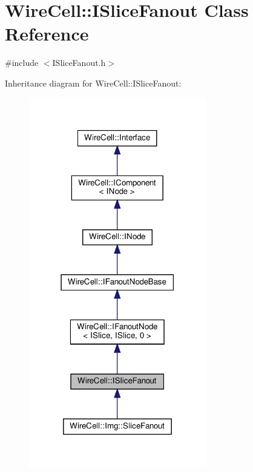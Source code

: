 \hypertarget{class_wire_cell_1_1_i_slice_fanout}{}\section{Wire\+Cell\+:\+:I\+Slice\+Fanout Class Reference}
\label{class_wire_cell_1_1_i_slice_fanout}


{\ttfamily \#include $<$I\+Slice\+Fanout.\+h$>$}



Inheritance diagram for Wire\+Cell\+:\+:I\+Slice\+Fanout\+:
\nopagebreak
\begin{figure}[H]
\begin{center}
\leavevmode
\includegraphics[width=219pt]{class_wire_cell_1_1_i_slice_fanout__inherit__graph}
\end{center}
\end{figure}


